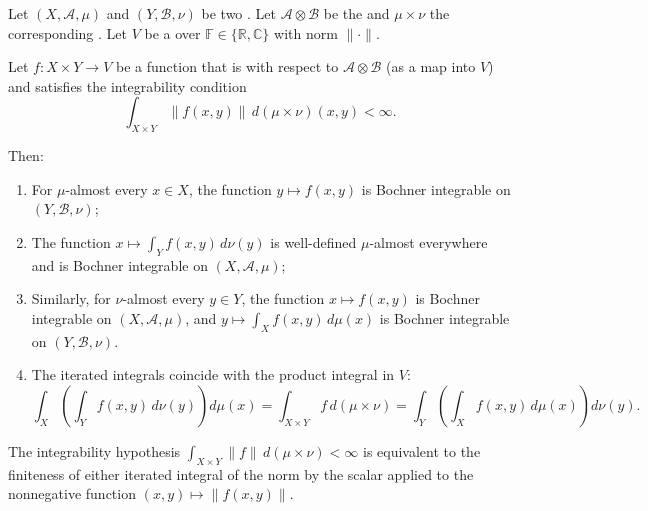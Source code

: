 \begin{theorem} \label{theorem:fubini_theorem_for_bochner_integrable_functions_into_banach_spaces}
Let $(X, \mathcal{A}, \mu)$ and $(Y, \mathcal{B}, \nu)$ be two . Let $\mathcal{A} \otimes \mathcal{B}$ be the  and $\mu \times \nu$ the corresponding . Let $V$ be a  over $\mathbb{F} \in \{\mathbb{R}, \mathbb{C}\}$ with norm $\|\cdot\|$.

Let $f : X \times Y \to V$ be a function that is  with respect to $\mathcal{A} \otimes \mathcal{B}$ (as a map into $V$) and satisfies the integrability condition
$$\int_{X \times Y} \|f(x, y)\|\,d(\mu \times \nu)(x, y) < \infty.$$

Then:
\begin{enumerate}
    \item For $\mu$-almost every $x \in X$, the function $y \mapsto f(x, y)$ is Bochner integrable on $(Y, \mathcal{B}, \nu)$;
    \item The function $x \mapsto \int_Y f(x, y)\,d\nu(y)$ is well-defined $\mu$-almost everywhere and is Bochner integrable on $(X, \mathcal{A}, \mu)$;
    \item Similarly, for $\nu$-almost every $y \in Y$, the function $x \mapsto f(x, y)$ is Bochner integrable on $(X, \mathcal{A}, \mu)$, and $y \mapsto \int_X f(x, y)\,d\mu(x)$ is Bochner integrable on $(Y, \mathcal{B}, \nu)$.
    \item The iterated integrals coincide with the product integral in $V$:
    $$\boxed{\int_X \left(\int_Y f(x, y)\,d\nu(y)\right) d\mu(x) = \int_{X \times Y} f\,d(\mu \times \nu) = \int_Y \left(\int_X f(x, y)\,d\mu(x)\right) d\nu(y).}$$
\end{enumerate}

The integrability hypothesis $\int_{X \times Y} \|f\|\,d(\mu \times \nu) < \infty$ is equivalent to the finiteness of either iterated integral of the norm by the scalar  applied to the nonnegative function $(x, y) \mapsto \|f(x, y)\|$.
\end{theorem}


